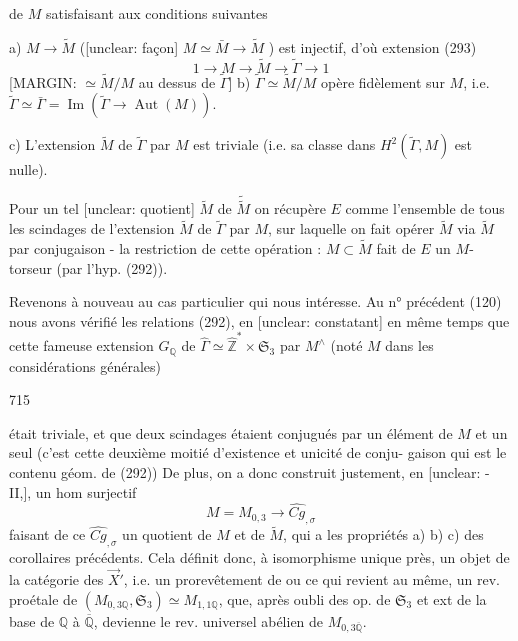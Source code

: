\newpage


de $M$ satisfaisant aux conditions suivantes

a) $M \to \tilde{M}$ ([unclear: façon] $M \simeq \bar{M} \to \tilde{M}$ ) est injectif,
d'où extension
(293) $$1 \to M \to \tilde{M} \to \tilde{\Gamma} \to 1$$
[MARGIN: $\simeq \tilde{M}/M$ au dessus de $\tilde{\Gamma}$]
b) $\tilde{\Gamma} \simeq \tilde{M}/M$ opère fidèlement sur $M$,
i.e. $\tilde{\Gamma} \simeq \bar{\Gamma} = \operatorname{Im}(\tilde{\Gamma} \to \operatorname{Aut}(M))$.

c) L'extension $\tilde{M}$ de $\tilde{\Gamma}$ par $M$ est
triviale (i.e. sa classe dans $H^2(\tilde{\Gamma}, M)$ est
nulle).

Pour un tel [unclear: quotient] $\tilde{M}$ de $\tilde{\tilde{M}}$ on récupère
$E$ comme l'ensemble de tous les
scindages de l'extension $\tilde{M}$ de $\tilde{\Gamma}$ par $M$,
sur laquelle on fait opérer $\tilde{M}$
via $\tilde{M}$ par conjugaison - la restriction
de cette opération : $M \subset \tilde{M}$ fait de $E$
un $M$-torseur (par l'hyp. (292)).

Revenons à nouveau au cas particulier
qui nous intéresse. Au n° précédent (120)
nous avons vérifié les relations (292),
en [unclear: constatant] en même temps que cette
fameuse extension $G_{\mathbb{Q}}$ de $\hat{\Gamma} \simeq \hat{\mathbb{Z}}^* \times \mathfrak{S}_3$
par $M^{\wedge}$ (noté $M$ dans les considérations
générales)

\newpage


715

était triviale, et que deux scindages
étaient conjugués par un élément de
$M$ et un seul (c'est cette deuxième
moitié d'existence et unicité de conju-
gaison qui est le contenu géom. de (292))
De plus, on a donc construit justement,
en [unclear: - II,], un hom surjectif
$$ M = M_{0,3} \longrightarrow \widehat{Cg}_{,\sigma} $$
faisant de ce $\widehat{Cg}_{,\sigma}$ un quotient de
$M$ et de $\tilde{M}$, qui a les propriétés
a) b) c) des corollaires précédents. Cela
définit donc, à isomorphisme unique
près, un objet de la catégorie des $\vec{X}'$,
i.e. un prorevêtement de
ou ce qui revient au même, un rev.
proétale de $(M_{0,3 \mathbb{Q}}, \mathfrak{S}_3) \simeq M_{1,1 \mathbb{Q}}$,
que, après oubli des op. de $\mathfrak{S}_3$ et
ext de la base de $\mathbb{Q}$ à $\overline{\mathbb{Q}}$, devienne
le rev. universel abélien de $M_{0,3 \overline{\mathbb{Q}}}$.

